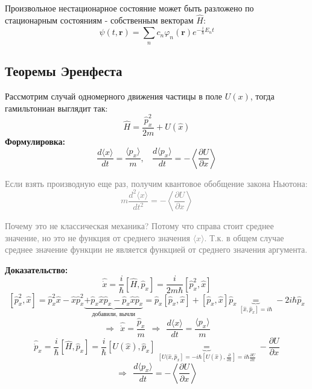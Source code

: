 		Произвольное нестационарное состояние может быть разложено по стационарным состояниям - собственным векторам $\hat{H}$:
		$$
			\psi(t,\textbf{r}) = \sum\limits_n c_n\varphi_n(\textbf{r})e^{-\frac{i}{\hbar}E_nt}
		$$
	\subsection{Теоремы Эренфеста}
		Рассмотрим случай одномерного движения частицы в поле $U(x)$, тогда гамильтониан выглядит так:
		$$
			\hat{H} = \frac{\hat{p}_x^2}{2m} + U(\hat{x})
		$$
		\textbf{Формулировка:}
		$$
			\frac{d\langle x\rangle}{dt} = \frac{\langle p_x\rangle}{m}, \ \ \ \ \frac{d\langle p_x\rangle}{dt} = -\left\langle\frac{\partial U}{\partial x}\right\rangle
		$$
		\textcolor{gray}{
			Если взять производную еще раз, получим квантовое обобщение закона Ньютона:
			$$
				m\frac{d^2\langle x\rangle}{dt^2} = -\left\langle\frac{\partial U}{\partial x}\right\rangle 
			$$
			\begin{scriptsize}
			\begin{spacing}{0.3}
				Почему это не классическая механика? Потому что справа стоит среднее значение, но это не функция от среднего значения $\langle x\rangle$. Т.к. в общем случае среднее значение функции не является функцией от среднего значения аргумента.
			\end{spacing}
			\end{scriptsize}	 
		}
		\bigskip
		\textbf{Доказательство:}\\
		$$
			\hat{\dot{x}} = \frac{i}{\hbar}\left[\hat{H},\hat{p}_x\right] = \frac{i}{2m\hbar}\left[\hat{p}^2_x,\hat{x}\right]
		$$
		$$
			\left[\hat{p}^2_x,\hat{x}\right] = \hat{p}^2_x\hat{x} - \hat{x}\hat{p}^2_x \underbrace{+ \hat{p}_x\hat{x}\hat{p}_x - \hat{p}_x\hat{x}\hat{p}_x}_{\text{добавили, вычли}} = \hat{p}_x\left[\hat{p}_x,\hat{x}\right] + \left[\hat{p}_x,\hat{x}\right]\hat{p}_x \underbrace{=}_{\left[\hat{x},\hat{p}_x\right] = i\hbar} -2i\hbar\hat{p}_x
		$$
		$$
			\Rightarrow \ \ \hat{\dot{x}} = \frac{\hat{p}_x}{m} \ \ \Rightarrow \ \ \frac{d\langle x\rangle}{dt} = \frac{\langle p_x\rangle}{m}
		$$
		$$
			\hat{\dot{p}}_x = \frac{i}{\hbar}\left[\hat{H},\hat{p}_x\right] = \frac{i}{\hbar}\left[U(\hat{x}),\hat{p}_x\right] \underbrace{=}_{\left[U(\hat{x},\hat{p}_x\right] = -i\hbar\left[U(\hat{x}),\frac{\partial}{\partial x}\right] = i\hbar\frac{\partial U}{\partial x}} -\frac{\partial U}{\partial x}
		$$
		$$
			\Rightarrow \ \ \frac{d\langle p_x\rangle}{dt} = -\left\langle\frac{\partial U}{\partial x}\right\rangle
		$$

